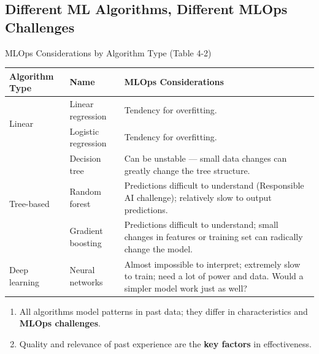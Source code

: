 \subsection{Different ML Algorithms, Different MLOps Challenges}

\begin{frame}{MLOps Considerations by Algorithm Type (Table 4-2)}
\begin{table}
\centering
\renewcommand{\arraystretch}{1.2}
\scriptsize
\begin{tabular}{|p{2cm}|p{2.4cm}|p{9.4cm}|}
\hline
\textbf{Algorithm Type} & \textbf{Name} & \textbf{MLOps Considerations} \\ \hline
\multirow{2}{*}{Linear} & Linear regression & Tendency for overfitting. \\ \cline{2-3}
 & Logistic regression & Tendency for overfitting. \\ \hline
\multirow{3}{*}{Tree-based} & Decision tree & Can be unstable --- small data changes can greatly change the tree structure. \\ \cline{2-3}
 & Random forest & Predictions difficult to understand (Responsible AI challenge); relatively slow to output predictions. \\ \cline{2-3}
 & Gradient boosting & Predictions difficult to understand; small changes in features or training set can radically change the model. \\ \hline
Deep learning & Neural networks & Almost impossible to interpret; extremely slow to train; need a lot of power and data. Would a simpler model work just as well? \\ \hline
\end{tabular}
\end{table}
\begin{enumerate}\small
\item<1-> All algorithms model patterns in past data; they differ in characteristics and \textbf{MLOps challenges}.
\item<2-> Quality and relevance of past experience are the \textbf{key factors} in effectiveness.
\end{enumerate}
\end{frame}

